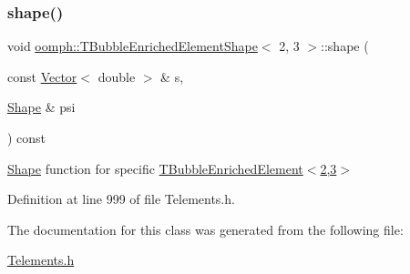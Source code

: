 \mbox{\label{classoomph_1_1TBubbleEnrichedElementShape_3_012_00_013_01_4_a5833a6f8ef77a5b1999f64e5ff083816}} 
\subsubsection{\texorpdfstring{shape()}{shape()}}
{\footnotesize\ttfamily void \hyperlink{classoomph_1_1TBubbleEnrichedElementShape}{oomph\+::\+T\+Bubble\+Enriched\+Element\+Shape}$<$ 2, 3 $>$\+::shape (\begin{DoxyParamCaption}\item[{const \hyperlink{classoomph_1_1Vector}{Vector}$<$ double $>$ \&}]{s,  }\item[{\hyperlink{classoomph_1_1Shape}{Shape} \&}]{psi }\end{DoxyParamCaption}) const\hspace{0.3cm}{\ttfamily [inline]}}



\hyperlink{classoomph_1_1Shape}{Shape} function for specific \hyperlink{classoomph_1_1TBubbleEnrichedElement}{T\+Bubble\+Enriched\+Element$<$2,3$>$} 



Definition at line 999 of file Telements.\+h.



The documentation for this class was generated from the following file\+:\begin{DoxyCompactItemize}
\item 
\hyperlink{Telements_8h}{Telements.\+h}\end{DoxyCompactItemize}
